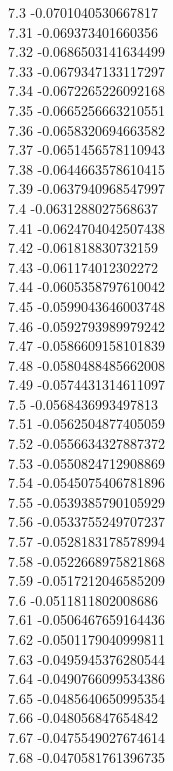 {7.3	-0.0701040530667817\\
7.31	-0.069373401660356\\
7.32	-0.0686503141634499\\
7.33	-0.0679347133117297\\
7.34	-0.0672265226092168\\
7.35	-0.0665256663210551\\
7.36	-0.0658320694663582\\
7.37	-0.0651456578110943\\
7.38	-0.0644663578610415\\
7.39	-0.0637940968547997\\
7.4	-0.0631288027568637\\
7.41	-0.0624704042507438\\
7.42	-0.061818830732159\\
7.43	-0.061174012302272\\
7.44	-0.0605358797610042\\
7.45	-0.0599043646003748\\
7.46	-0.0592793989979242\\
7.47	-0.0586609158101839\\
7.48	-0.0580488485662008\\
7.49	-0.0574431314611097\\
7.5	-0.0568436993497813\\
7.51	-0.0562504877405059\\
7.52	-0.0556634327887372\\
7.53	-0.0550824712908869\\
7.54	-0.0545075406781896\\
7.55	-0.0539385790105929\\
7.56	-0.0533755249707237\\
7.57	-0.0528183178578994\\
7.58	-0.0522668975821868\\
7.59	-0.0517212046585209\\
7.6	-0.0511811802008686\\
7.61	-0.0506467659164436\\
7.62	-0.0501179040999811\\
7.63	-0.0495945376280544\\
7.64	-0.0490766099534386\\
7.65	-0.0485640650995354\\
7.66	-0.048056847654842\\
7.67	-0.0475549027674614\\
7.68	-0.0470581761396735\\
}
